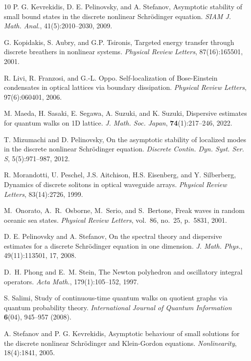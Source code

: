 \documentclass[12pt]{amsart}
\begin{document}
\begin{thebibliography}{10}
		P. G. Kevrekidis, D. E. Pelinovsky, and A. Stefanov, Asymptotic stability of small bound states in the discrete nonlinear Schrödinger equation. \emph{SIAM J. Math. Anal.}, 41(5):2010--2030, 2009.
		
		G. Kopidakis, S. Aubry, and G.P. Tsironis, Targeted energy transfer through discrete breathers in nonlinear systems. \emph{Physical Review Letters}, 87(16):165501, 2001.
		
		R. Livi, R. Franzosi, and G.-L. Oppo. Self-localization of Bose-Einstein condensates in optical lattices via boundary dissipation. \emph{Physical Review Letters}, 97(6):060401, 2006.
		
		M. Maeda, H. Sasaki, E. Segawa, A. Suzuki, and K. Suzuki,
		Dispersive estimates for quantum walks on 1D lattice.
		\emph{J. Math. Soc. Japan}, \textbf{74}(1):217--246, 2022.
		
		T. Mizumachi and D. Pelinovsky, On the asymptotic stability of localized modes in the discrete nonlinear Schrödinger equation.  \emph{Discrete Contin. Dyn. Syst. Ser. S}, 5(5):971--987, 2012.
		
		R. Morandotti, U. Peschel, J.S. Aitchison, H.S. Eisenberg, and Y. Silberberg, Dynamics of discrete solitons in optical waveguide arrays.
		\emph{Physical Review Letters}, 83(14):2726, 1999.

        M.~Onorato, A.~R.~Osborne, M.~Serio, and S.~Bertone, Freak waves in random oceanic sea states.
        \emph{Physical Review Letters}, vol.~86, no.~25, p.~5831, 2001.

		D. E. Pelinovsky and A. Stefanov, On the spectral theory and dispersive estimates for a discrete Schrödinger equation in one dimension.
		\emph{J. Math. Phys.}, 49(11):113501, 17, 2008.

        D.~H. Phong and E.~M. Stein, The Newton polyhedron and oscillatory integral operators.
        \emph{ Acta Math.}, 179(1):105--152, 1997.
		
		S. Salimi, Study of continuous-time quantum walks on quotient graphs via quantum probability theory.
		\emph{International Journal of Quantum Information} \textbf{6}(04), 945--957 (2008).
		
		 A. Stefanov and P. G. Kevrekidis, Asymptotic behaviour of small solutions for the discrete nonlinear Schrödinger and Klein-Gordon equations. \emph{Nonlinearity}, 18(4):1841, 2005.
		

\end{thebibliography}
\end{document}

